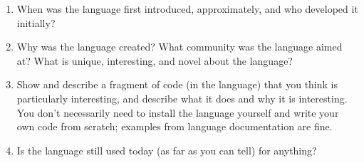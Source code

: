 \documentclass{article}
\begin{document}
\begin{enumerate}
\item When was the language first introduced, approximately, and who developed it initially?

\vspace*{5em}

\item Why was the language created? What community was the language aimed at? What is unique, interesting, and novel about the language?

  \vspace*{5em}

  \item Show and describe a fragment of code (in the language) that you think is particularly interesting, and describe what it does and why it is interesting. You don’t necessarily need to install the language yourself and write your own code from scratch; examples from language documentation are fine.

    \vspace*{30em}

  \item Is the language still used today (as far as you can tell) for anything?

\end{enumerate}
\end{document}
